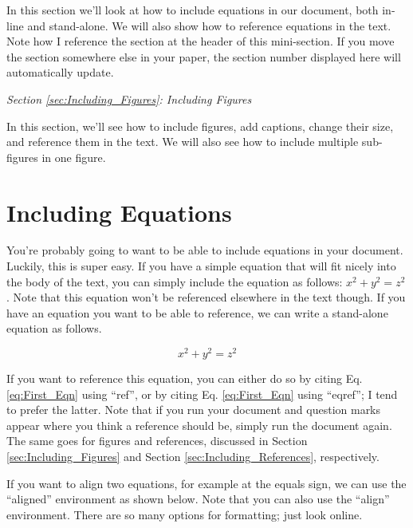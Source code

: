 \documentclass[letterpaper,12pt]{article}
\begin{document}
In this section we'll look at how to include equations in our document, both in-line and stand-alone.  We will also show how to reference equations in the text.  Note how I reference the section at the header of this mini-section.  If you move the section somewhere else in your paper, the section number displayed here will automatically update.

\vspace{1em}
\noindent \emph{Section \ref{sec:Including_Figures}: Including Figures}
\vspace{1em}

In this section, we'll see how to include figures, add captions, change their size, and reference them in the text.  We will also see how to include multiple sub-figures in one figure.

\section{Including Equations}
\label{sec:Including_Equations}

You're probably going to want to be able to include equations in your document.  Luckily, this is super easy.  If you have a simple equation that will fit nicely into the body of the text, you can simply include the equation as follows: $x^2 + y^2 = z^2$.  Note that this equation won't be referenced elsewhere in the text though.  If you have an equation you want to be able to reference, we can write a stand-alone equation as follows.

\begin{equation}
x^2 + y^2 = z^2
\label{eq:First_Eqn}
\end{equation}

\noindent If you want to reference this equation, you can either do so by citing Eq. \ref{eq:First_Eqn} using ``ref'', or by citing Eq. \eqref{eq:First_Eqn} using ``eqref''; I tend to prefer the latter.  Note that if you run your document and question marks appear where you think a reference should be, simply run the document again.  The same goes for figures and references, discussed in Section \ref{sec:Including_Figures} and Section \ref{sec:Including_References}, respectively.

If you want to align two equations, for example at the equals sign, we can use the ``aligned'' environment as shown below.  Note that you can also use the ``align'' environment.  There are so many options for formatting; just look online.
\end{document}
